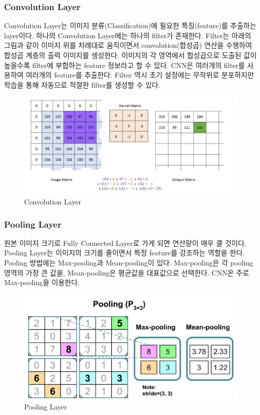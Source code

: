     \subsubsection*{Convolution Layer}
    Convolution Layer는 이미지 분류(Classification)에 필요한 특징(feature)를 추출하는 layer이다. 하나의 Convolution Layer에는 하나의 filter가 존재한다. Filter는 아래의 그림과 같이 이미지 위를 차례대로 움직이면서 convolution(합성곱) 연산을 수행하여 합성곱 계층의 출력 이미지를 생성한다. 이미지의 각 영역에서 합성곱으로 도출된 값이 높을수록 filter에 부합하는 feature 정보라고 할 수 있다. CNN은 여러개의 filter를 사용하여 여러개의 feature를 추출한다. Filter 역시 초기 설정에는 무작위로 분포하지만 학습을 통해 자동으로 적절한 filter를 생성할 수 있다.
    \vspace{-4mm}
    \begin{figure}[!h]\centering
		\includegraphics[width=.65\textwidth]{image/week04/2-3.png}
		\caption{\small Convolution Layer}
		\vspace{-10pt}
    \end{figure}
    
    \subsubsection*{Pooling Layer}
    원본 이미지 크기로 Fully Connected Layer로 가게 되면 연산량이 매우 클 것이다. Pooling Layer는 이미지의 크기를 줄이면서 특정 feature를 강조하는 역할을 한다. Pooling 방법에는 Max-pooling과 Mean-pooling이 있다. Max-pooling은 각 pooling 영역의 가장 큰 값을, Mean-pooling은 평균값을 대표값으로 선택한다. CNN은 주로 Max-pooling을 이용한다. 
    \vspace{-4mm}
    \begin{figure}[!h]\centering
		\includegraphics[width=.65\textwidth]{image/week04/2-4.png}
		\caption{\small Pooling Layer}
		\vspace{-10pt}
    \end{figure}
    
